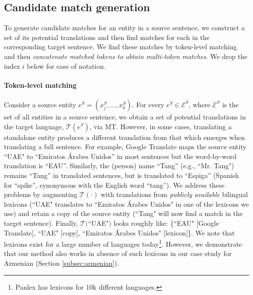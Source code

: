 \documentclass[11pt,a4paper]{article}
\begin{document}
\subsection{Candidate match generation \label{sec:cand-match-gen}}
To generate candidate matches for an entity in a source sentence, 
we construct a set of its potential translations 
and then find matches for each  in the corresponding target sentence. 
We find these matches by token-level matching and then
\emph{concatenate matched tokens to obtain multi-token matches}. We drop the index $i$ below for ease of notation.


\paragraph{Token-level matching \label{sec:tok-level}}
Consider a source entity $e^S=(x^S_{j},...,x^S_{k})$. 
For every $e^S \in \mathcal{E}^S$, 
where $\mathcal{E}^S$ is the set of all entities in a source sentence, 
we obtain a set of potential translations in the target language, $\mathcal{T}(e^S)$, 
via MT.
However, in some cases, 
translating a standalone entity
produces a different translation 
from that which emerges when translating 
a full sentence.
For example, Google Translate maps the source entity ``UAE"
to ``Emiratos \'Arabes Unidos'' in most sentences 
but the word-by-word translation is ``EAU''. 
Similarly, the (person) name ``Tang'' (e.g., ``Mr. Tang") 
remains ``Tang'' in translated sentences, 
but is translated to ``Espiga'' 
(Spanish for ``spike'', synonymous 
with the English word ``tang''). 
We address these problems by augmenting $\mathcal{T}(\cdot)$ 
with translations
from \emph{publicly available} bilingual lexicons 
(``UAE" translates to ``Emiratos \'Arabes Unidos" in one of the lexicons we use) 
and retain
a copy of the source entity 
(``Tang" will now find a match in the target sentence). 
Finally, $\mathcal{T}($``UAE"$)$ looks roughly like: 
\{``EAU" [Google Translate], ``UAE" [copy], ``Emiratos \'Arabes Unidos" [lexicon]\}. 
We note that lexicons exist for a large number of languages today\footnote{Panlex \cite{kamholz2014panlex} has lexicons for 10k different languages.}.
However, we demonstrate that our method 
also works in absence of such lexicons 
in our case study for Armenian 
(Section \ref{subsec:armenian}).
\end{document}
